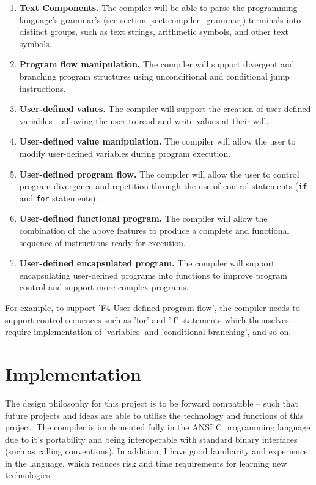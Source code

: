 \documentclass[11pt,a4paper]{report}
\begin{document}
\begin{enumerate}[label=F\arabic*.]
\item{\textbf{Text Components.} The compiler will be able to parse the programming language's grammar's (see section {}  \ref{sect:compiler_grammar}) terminals into distinct groups, such as text strings, arithmetic symbols, and other text symbols.}
\item{\textbf{Program flow manipulation.} The compiler will support divergent and branching program structures using unconditional and conditional jump instructions.}
\item{\textbf{User-defined values.} The compiler will support the creation of user-defined variables -- allowing the user to read and write values at their will.}
\item{\textbf{User-defined value manipulation.} The compiler will allow the user to modify user-defined variables during program execution.}
\item{\textbf{User-defined program flow.} The compiler will allow the user to control program divergence and repetition through the use of control statements (\verb|if| and \verb|for| statements).}
\item{\textbf{User-defined functional program.} The compiler will allow the combination of the above features to produce a complete and functional sequence of instructions ready for execution.}
\item{\textbf{User-defined encapsulated program.} The compiler will support encapsulating user-defined programs into functions to improve program control and support more complex programs.}
\end{enumerate}

For example, to support 'F4 User-defined program flow', the compiler needs to support control sequences such as 'for' and 'if' statements which themselves require implementation of 'variables' and 'conditional branching', and so on.

\section{Implementation}
The design philosophy for this project is to be forward compatible -- such that future projects and ideas are able to utilise the technology and functions of this project. The compiler is implemented fully in the ANSI C programming language due to it's portability and being interoperable with standard binary interfaces (such as calling conventions). In addition, I have good familiarity and experience in the language, which reduces risk and time requirements for learning new technologies.
\end{document}
